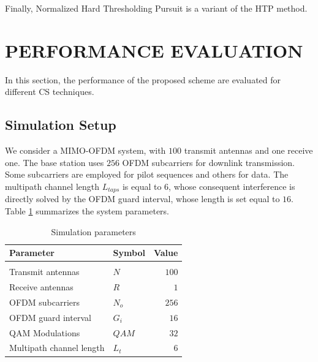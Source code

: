 Finally, Normalized Hard Thresholding Pursuit is a variant of the HTP method.

\section{PERFORMANCE EVALUATION}
\label{Perf}
In this section, the performance of the proposed scheme are evaluated for different CS techniques.

\subsection{Simulation Setup}
\label{SimSetup}
We consider a MIMO-OFDM system, with $100$ transmit antennas and one receive one. The base station uses $256$ OFDM subcarriers for downlink transmission. Some subcarriers are employed for pilot sequences and others for data. The multipath channel length $L_{taps}$ is equal to $6$, whose consequent interference is directly solved by the OFDM guard interval, whose  length is set equal to $16$. Table \ref{tabSim} summarizes the system parameters.
\begin{table} \footnotesize
	\renewcommand{\arraystretch}{1.1}
	\caption{Simulation parameters}
	\label{tabSim}
	\centering
	\begin{tabular}{llr}
		\textbf{Parameter}&\textbf{Symbol}&\textbf{Value}\\
		\hline
		\\
		Transmit antennas & $N$&$100$\\
		Receive antennas & $R$&$1$\\
		OFDM subcarriers & $N_o$&$256$\\
		OFDM guard interval & $G_i$&$16$\\
		QAM Modulations & $QAM$&$32$\\
		Multipath channel length & $L_t$&$6$\\
	\end{tabular}
\end{table}
